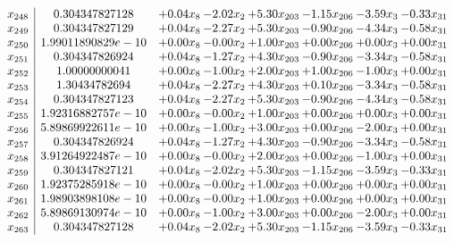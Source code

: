 \documentclass[8pt]{article}
\begin{document}
\[\begin{array}{c| c c@{\hskip 2pt} c@{\hskip 2pt} c@{\hskip 2pt} c@{\hskip 2pt} c@{\hskip 2pt} c@{\hskip 2pt} }
 x_{248}   &  0.304347827128 & +  0.04 x_{8} & -2.02 x_{2} & +  5.30 x_{203} & -1.15 x_{206} & -3.59 x_{3} & -0.33 x_{31}\\
 x_{249}   &  0.304347827129 & +  0.04 x_{8} & -2.27 x_{2} & +  5.30 x_{203} & -0.90 x_{206} & -4.34 x_{3} & -0.58 x_{31}\\
 x_{250}   &  1.99011890829e-10 & +  0.00 x_{8} & -0.00 x_{2} & +  1.00 x_{203} & +  0.00 x_{206} & +  0.00 x_{3} & +  0.00 x_{31}\\
 x_{251}   &  0.304347826924 & +  0.04 x_{8} & -1.27 x_{2} & +  4.30 x_{203} & -0.90 x_{206} & -3.34 x_{3} & -0.58 x_{31}\\
 x_{252}   &  1.00000000041 & +  0.00 x_{8} & -1.00 x_{2} & +  2.00 x_{203} & +  1.00 x_{206} & -1.00 x_{3} & +  0.00 x_{31}\\
 x_{253}   &  1.30434782694 & +  0.04 x_{8} & -2.27 x_{2} & +  4.30 x_{203} & +  0.10 x_{206} & -3.34 x_{3} & -0.58 x_{31}\\
 x_{254}   &  0.304347827123 & +  0.04 x_{8} & -2.27 x_{2} & +  5.30 x_{203} & -0.90 x_{206} & -4.34 x_{3} & -0.58 x_{31}\\
 x_{255}   &  1.92316882757e-10 & +  0.00 x_{8} & -0.00 x_{2} & +  1.00 x_{203} & +  0.00 x_{206} & +  0.00 x_{3} & +  0.00 x_{31}\\
 x_{256}   &  5.89869922611e-10 & +  0.00 x_{8} & -1.00 x_{2} & +  3.00 x_{203} & +  0.00 x_{206} & -2.00 x_{3} & +  0.00 x_{31}\\
 x_{257}   &  0.304347826924 & +  0.04 x_{8} & -1.27 x_{2} & +  4.30 x_{203} & -0.90 x_{206} & -3.34 x_{3} & -0.58 x_{31}\\
 x_{258}   &  3.91264922487e-10 & +  0.00 x_{8} & -0.00 x_{2} & +  2.00 x_{203} & +  0.00 x_{206} & -1.00 x_{3} & +  0.00 x_{31}\\
 x_{259}   &  0.304347827121 & +  0.04 x_{8} & -2.02 x_{2} & +  5.30 x_{203} & -1.15 x_{206} & -3.59 x_{3} & -0.33 x_{31}\\
 x_{260}   &  1.92375285918e-10 & +  0.00 x_{8} & -0.00 x_{2} & +  1.00 x_{203} & +  0.00 x_{206} & +  0.00 x_{3} & +  0.00 x_{31}\\
 x_{261}   &  1.98903898108e-10 & +  0.00 x_{8} & -0.00 x_{2} & +  1.00 x_{203} & +  0.00 x_{206} & +  0.00 x_{3} & +  0.00 x_{31}\\
 x_{262}   &  5.89869130974e-10 & +  0.00 x_{8} & -1.00 x_{2} & +  3.00 x_{203} & +  0.00 x_{206} & -2.00 x_{3} & +  0.00 x_{31}\\
 x_{263}   &  0.304347827128 & +  0.04 x_{8} & -2.02 x_{2} & +  5.30 x_{203} & -1.15 x_{206} & -3.59 x_{3} & -0.33 x_{31}\\

\end{array}\]
\end{document}

